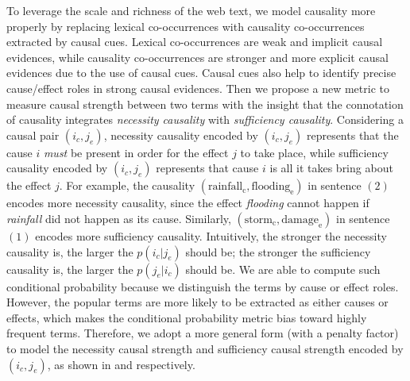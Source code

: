 To leverage the scale and richness of the web text,
we model causality more properly by replacing lexical co-occurrences with
causality co-occurrences extracted by causal cues.
Lexical co-occurrences are weak and implicit causal evidences,
while causality co-occurrences are stronger and more explicit causal
evidences due to the use of causal cues.
Causal cues also help to identify precise cause/effect roles in
strong causal evidences.
Then we propose a new metric to measure causal strength between
two terms with the insight that the connotation of causality
integrates \emph{necessity causality}
with \emph{sufficiency causality}.
Considering a causal pair $(i_c,j_e)$,
necessity causality encoded by $(i_c, j_e)$ represents
that the cause $i$ {\em must} be present in order for
the effect $j$ to take place,
while sufficiency causality encoded by $(i_c, j_e)$ represents
that cause $i$ is all it takes bring about the effect $j$.
For example, the causality $(\text{rainfall}_{\text{c}}, \text{flooding}_{\text{e}})$
in sentence $(2)$  encodes more necessity causality,
since the effect \textit{flooding} cannot happen
if \textit{rainfall} did not happen as its cause.
Similarly, $(\text{storm}_{\text{c}}, \text{damage}_{\text{e}})$ in
sentence $(1)$ encodes more sufficiency causality.
Intuitively, the stronger the necessity causality is, the larger
the $p(i_c|j_e)$ should be;
the stronger the sufficiency causality is, the larger
the $p(j_e|i_c)$ should be.
We are able to compute such conditional probability because we distinguish
the terms by cause or effect roles. However, the popular terms are
more likely to be extracted as either causes or effects,
which makes the conditional probability metric bias toward
highly frequent terms.
Therefore, we adopt a more general form (with a penalty factor)
to model the necessity causal strength and
sufficiency causal strength encoded by $(i_c,j_e)$,
as shown in  and  respectively.

